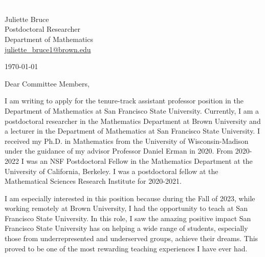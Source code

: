\documentclass[11pt]{article}
\begin{document}
\section*{}

\noindent
\begin{minipage}{0.99\textwidth}
\begin{minipage}{0.69\textwidth}
\textcolor{white}{.}
\end{minipage}
\begin{minipage}{0.29\textwidth}
{
Juliette Bruce \\
Postdoctoral Researcher \\
Department of Mathematics \\
\href{mailto:juliette\_bruce1@brown.edu}{juliette\_bruce1@brown.edu}
}

\vspace{12pt}
\today
\end{minipage}
\end{minipage}


\vspace{12pt}
\noindent
Dear Committee Members,

I am writing to apply for the tenure-track assistant professor position in the Department of Mathematics at San Francisco State University. Currently, I am a postdoctoral researcher in the Mathematics Department at Brown University and a lecturer in the Department of Mathematics at San Francisco State University. I received my Ph.D. in Mathematics from the University of Wisconsin-Madison under the guidance of my advisor Professor Daniel Erman in 2020. From 2020-2022 I was an NSF Postdoctoral Fellow in the Mathematics Department at the University of California, Berkeley. I was a postdoctoral fellow at the Mathematical Sciences Research Institute for 2020-2021.

I am especially interested in this position because during the Fall of 2023, while working remotely at Brown University, I had the opportunity to teach at San Francisco State University.  In this role, I saw the amazing positive impact San Francisco State University has on helping a wide range of students, especially those from underrepresented and underserved groups, achieve their dreams. This proved to be one of the most rewarding teaching experiences I have ever had. 
\end{document}
